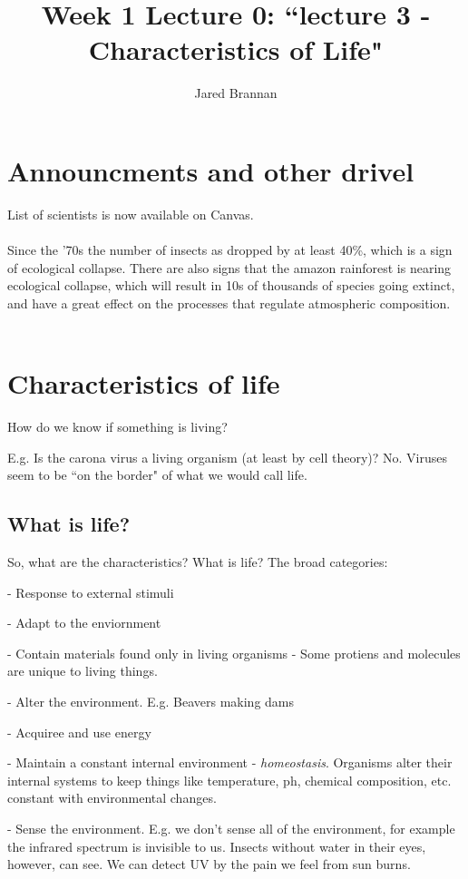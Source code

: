 \documentclass{article}
\title{Week 1 Lecture 0: ``lecture 3 - Characteristics of Life"}
\author{Jared Brannan }
\theoremstyle{definition}
\begin{document}
\maketitle

\section{Announcments and other drivel}

List of scientists is now available on Canvas.\\~\\

Since the '70s the number of insects as dropped by at least 40\%, which is a sign of ecological collapse. There are also signs that the amazon rainforest is nearing ecological collapse, which will result in 10s of thousands of species going extinct, and have a great effect on the processes that regulate atmospheric composition.\\~\\

\section{Characteristics of life}
How do we know if something is living?

E.g. Is the carona virus a living organism (at least by cell theory)? No. Viruses seem to be ``on the border" of what we would call life.

\subsection{What is life?}
So, what are the characteristics? What is life? The broad categories:

- Response to external stimuli

- Adapt to the enviornment

- Contain materials found only in living organisms - Some protiens and molecules are unique to living things.

- Alter the environment. E.g. Beavers making dams

- Acquiree and use energy

- Maintain a constant internal environment - \textit{homeostasis}. Organisms alter their internal systems to keep things like temperature, ph, chemical composition, etc. constant with environmental changes.

- Sense the environment. E.g. we don't sense all of the environment, for example the infrared spectrum is invisible to us. Insects without water in their eyes, however, can see. We can detect UV by the pain we feel from sun burns.
\end{document}
